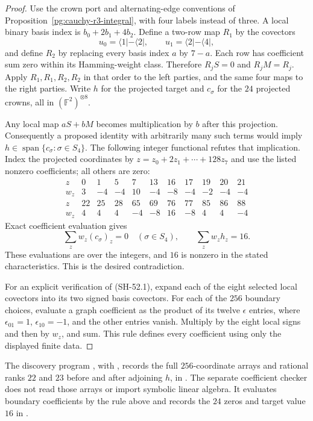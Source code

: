 \begin{proof}
Use the crown port and alternating-edge conventions of
Proposition~\ref{pg:cauchy-r3-integral}, with four labels
instead of three.  A local binary basis index is
$b_0+2b_1+4b_2$.  Define a two-row map $R_1$ by the covectors
\[
 u_0=\langle1|-\langle2|,
 \qquad u_1=\langle2|-\langle4|,
\]
and define $R_2$ by replacing every basis index $a$ by $7-a$.
Each row has coefficient sum zero within its Hamming-weight
class.  Therefore $R_jS=0$ and $R_jM=R_j$.
Apply $R_1,R_1,R_2,R_2$ in that order to the left parties,
and the same four maps to the right parties.  Write $h$ for
the projected target and $c_\sigma$ for the $24$ projected
crowns, all in $(\mathbb F^2)^{\otimes8}$.

Any local map $aS+bM$ becomes multiplication by $b$ after
this projection.  Consequently a proposed identity with
arbitrarily many such terms would imply
$h\in\operatorname{span}\{c_\sigma:\sigma\in S_4\}$.
The following integer functional refutes that implication.
Index the projected coordinates by
$z=z_0+2z_1+\cdots+128z_7$ and use the listed nonzero
coefficients; all others are zero:
\[
\begin{array}{c|rrrrrrrrrr}
z&0&1&5&7&13&16&17&19&20&21\\\hline
w_z&3&-4&-4&10&-4&-8&-4&-2&-4&-4\\[2pt]
z&22&25&28&65&69&76&77&85&86&88\\\hline
w_z&4&4&4&-4&-8&16&-8&4&4&-4
\end{array}
\]
Exact coefficient evaluation gives
\[
 \sum_z w_z(c_\sigma)_z=0\quad(\sigma\in S_4),
 \qquad \sum_z w_zh_z=16.                       \tag{SH-52.1}
\]
These evaluations are over the integers, and $16$ is
nonzero in the stated characteristics.  This is the desired
contradiction.

For an explicit verification of (SH-52.1), expand each of
the eight selected local covectors into its two signed
basis covectors.  For each of the $256$ boundary choices,
evaluate a graph coefficient as the product of its twelve
$\epsilon$ entries, where
$\epsilon_{01}=1$, $\epsilon_{10}=-1$, and the other
entries vanish.  Multiply by the eight local signs and
then by $w_z$, and sum.  This rule defines every coefficient
using only the displayed finite data.
\end{proof}

The discovery program
, with
, records the
full $256$-coordinate arrays and rational ranks $22$ and
$23$ before and after adjoining $h$, in
.
The separate coefficient checker
 does not
read those arrays or import symbolic linear algebra.  It
evaluates boundary coefficients by the rule above and
records the $24$ zeros and target value $16$ in
.

